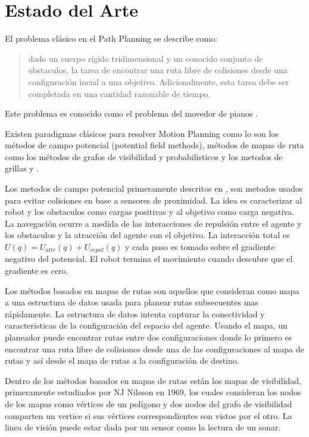 \section{Estado del Arte}

El problema cl\'asico en el Path Planning se describe como:
\begin{quote}
dado un cuerpo r\'igido tridimensional y un conocido conjunto de obstaculos, la tarea de encontrar una ruta libre de colisiones desde una configuraci\'on incial a una objetivo. Adicionalmente, esta tarea debe ser completada en una cantidad razonable de tiempo.
\end{quote}
Este problema es conocido como el problema del movedor de pianos \cite{Swartz83}.

Existen paradigmas cl\'asicos para resolver Motion Planning como lo son los m\'etodos de campo potencial (potential field methods), m\'etodos de mapas de ruta como los m\'etodos de grafos de visibilidad y probabilisticos y los metodos de grillas \cite{Wang03} y \cite{Zhuang04} .

Los metodos de campo potencial primeramente descritos en \cite{Kathib85}, son metodos usados para evitar colisiones en base a sensores de proximidad. La idea es caracterizar al robot y los obstaculos como cargas positivas y al objetivo como carga negativa. La navegaci\'on ocurre a medida de las interacciones de repulsi\'on entre el agente y los obstaculos y la atracci\'on del agente con el objetivo. La interacci\'on total es $U(q) = U_{attr}(q) + U_{repul}(q)$ y cada paso es tomado sobre el gradiente negativo del potencial. El robot termina el movimiento cuando descubre que el gradiente es cero.

Los m\'etodos basados en mapas de rutas son aquellos que consideran como mapa a una estructura de datos usada para planear rutas subsecuentes mas r\'apidamente. La estructura de datos intenta capturar la conectividad y caracteristicas de la configuraci\'on del espacio del agente. Usando el mapa, un planeador puede encontrar rutas entre dos configuraciones donde lo primero es encontrar una ruta libre de colisiones desde una de las configuraciones al mapa de rutas y as\'i desde el mapa de rutas a la configuraci\'on de destino.

Dentro de los m\'etodos basados en mapas de rutas est\'an los mapas de visibilidad, primeramente estudiados por NJ Nilsson en 1969, los cuales consideran los nodos de los mapas como v\'ertices de un pol\'igono y dos nodos del grafo de visibilidad comparten un vertice si sus v\'ertices correspondientes son vistos por el otro. La linea de visi\'on puede estar dada por un sensor como la lectura de un sonar.

